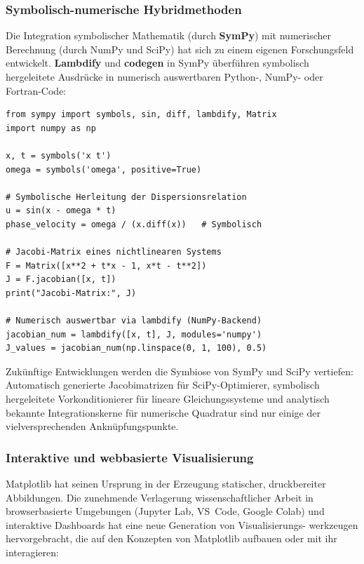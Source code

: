 \documentclass[12pt, a4paper]{article}
\begin{document}
\subsubsection{Symbolisch-numerische Hybridmethoden}
\label{subsubsec:sympy}

Die Integration symbolischer Mathematik (durch \textbf{SymPy}) mit
numerischer Berechnung (durch NumPy und SciPy) hat sich zu einem eigenen
Forschungsfeld entwickelt. \textbf{Lambdify} und \textbf{codegen} in SymPy
überführen symbolisch hergeleitete Ausdrücke in numerisch auswertbaren
Python-, NumPy- oder Fortran-Code:

\begin{lstlisting}[caption={SymPy + NumPy: Symbolisch-numerische Pipeline}]
from sympy import symbols, sin, diff, lambdify, Matrix
import numpy as np

x, t = symbols('x t')
omega = symbols('omega', positive=True)

# Symbolische Herleitung der Dispersionsrelation
u = sin(x - omega * t)
phase_velocity = omega / (x.diff(x))   # Symbolisch

# Jacobi-Matrix eines nichtlinearen Systems
F = Matrix([x**2 + t*x - 1, x*t - t**2])
J = F.jacobian([x, t])
print("Jacobi-Matrix:", J)

# Numerisch auswertbar via lambdify (NumPy-Backend)
jacobian_num = lambdify([x, t], J, modules='numpy')
J_values = jacobian_num(np.linspace(0, 1, 100), 0.5)
\end{lstlisting}

Zukünftige Entwicklungen werden die Symbiose von SymPy und SciPy
vertiefen: Automatisch generierte Jacobimatrizen für SciPy-Optimierer,
symbolisch hergeleitete Vorkonditionierer für lineare Gleichungssysteme
und analytisch bekannte Integrationskerne für numerische Quadratur sind
nur einige der vielversprechenden Anknüpfungspunkte.

\subsubsection{Interaktive und webbasierte Visualisierung}
\label{subsubsec:interactive-viz}

Matplotlib hat seinen Ursprung in der Erzeugung statischer,
druckbereiter Abbildungen. Die zunehmende Verlagerung wissenschaftlicher
Arbeit in browserbasierte Umgebungen (Jupyter Lab, VS~Code, Google Colab)
und interaktive Dashboards hat eine neue Generation von Visualisierungs-
werkzeugen hervorgebracht, die auf den Konzepten von Matplotlib aufbauen
oder mit ihr interagieren:
\end{document}
